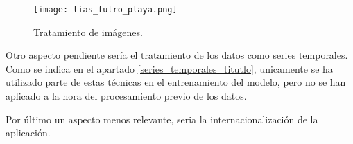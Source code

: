 \begin{figure}%
	\centering
	\texttt{[image: lias\_futro\_playa.png]}
	\caption[Tratamiento de imágenes]{Tratamiento de imágenes.}\label{tImg}
\end{figure}


Otro aspecto pendiente sería el tratamiento de los datos como series temporales. Como se indica en el apartado \ref{series_temporales_titutlo}, unicamente se ha utilizado parte de estas técnicas en el entrenamiento del modelo, pero no se han aplicado a la hora del procesamiento previo de los datos.

Por último un aspecto menos relevante, seria la internacionalización de la aplicación. 